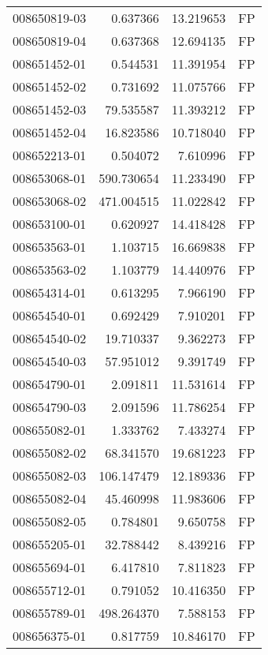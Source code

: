 \begin{tabular}{lrrl}
008650819-03 &    0.637366 &      13.219653 &   FP \\
008650819-04 &    0.637368 &      12.694135 &   FP \\
008651452-01 &    0.544531 &      11.391954 &   FP \\
008651452-02 &    0.731692 &      11.075766 &   FP \\
008651452-03 &   79.535587 &      11.393212 &   FP \\
008651452-04 &   16.823586 &      10.718040 &   FP \\
008652213-01 &    0.504072 &       7.610996 &   FP \\
008653068-01 &  590.730654 &      11.233490 &   FP \\
008653068-02 &  471.004515 &      11.022842 &   FP \\
008653100-01 &    0.620927 &      14.418428 &   FP \\
008653563-01 &    1.103715 &      16.669838 &   FP \\
008653563-02 &    1.103779 &      14.440976 &   FP \\
008654314-01 &    0.613295 &       7.966190 &   FP \\
008654540-01 &    0.692429 &       7.910201 &   FP \\
008654540-02 &   19.710337 &       9.362273 &   FP \\
008654540-03 &   57.951012 &       9.391749 &   FP \\
008654790-01 &    2.091811 &      11.531614 &   FP \\
008654790-03 &    2.091596 &      11.786254 &   FP \\
008655082-01 &    1.333762 &       7.433274 &   FP \\
008655082-02 &   68.341570 &      19.681223 &   FP \\
008655082-03 &  106.147479 &      12.189336 &   FP \\
008655082-04 &   45.460998 &      11.983606 &   FP \\
008655082-05 &    0.784801 &       9.650758 &   FP \\
008655205-01 &   32.788442 &       8.439216 &   FP \\
008655694-01 &    6.417810 &       7.811823 &   FP \\
008655712-01 &    0.791052 &      10.416350 &   FP \\
008655789-01 &  498.264370 &       7.588153 &   FP \\
008656375-01 &    0.817759 &      10.846170 &   FP \\

\end{tabular}
